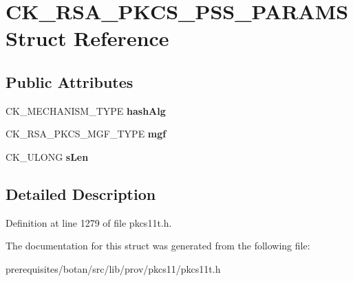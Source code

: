 \hypertarget{struct_c_k___r_s_a___p_k_c_s___p_s_s___p_a_r_a_m_s}{}\section{C\+K\+\_\+\+R\+S\+A\+\_\+\+P\+K\+C\+S\+\_\+\+P\+S\+S\+\_\+\+P\+A\+R\+A\+MS Struct Reference}
\label{struct_c_k___r_s_a___p_k_c_s___p_s_s___p_a_r_a_m_s}
\subsection*{Public Attributes}
\begin{DoxyCompactItemize}
\item 
\mbox{\label{struct_c_k___r_s_a___p_k_c_s___p_s_s___p_a_r_a_m_s_aa4db3297a22a4148dbb5d96f33d10845}} 
C\+K\+\_\+\+M\+E\+C\+H\+A\+N\+I\+S\+M\+\_\+\+T\+Y\+PE {\bfseries hash\+Alg}
\item 
\mbox{\label{struct_c_k___r_s_a___p_k_c_s___p_s_s___p_a_r_a_m_s_a61dc8196e9a08bb24683c6d4836fdd75}} 
C\+K\+\_\+\+R\+S\+A\+\_\+\+P\+K\+C\+S\+\_\+\+M\+G\+F\+\_\+\+T\+Y\+PE {\bfseries mgf}
\item 
\mbox{\label{struct_c_k___r_s_a___p_k_c_s___p_s_s___p_a_r_a_m_s_a04aaadbd6be8a61d43ea4a15b6c562ed}} 
C\+K\+\_\+\+U\+L\+O\+NG {\bfseries s\+Len}
\end{DoxyCompactItemize}


\subsection{Detailed Description}


Definition at line 1279 of file pkcs11t.\+h.



The documentation for this struct was generated from the following file\+:\begin{DoxyCompactItemize}
\item 
prerequisites/botan/src/lib/prov/pkcs11/pkcs11t.\+h\end{DoxyCompactItemize}
